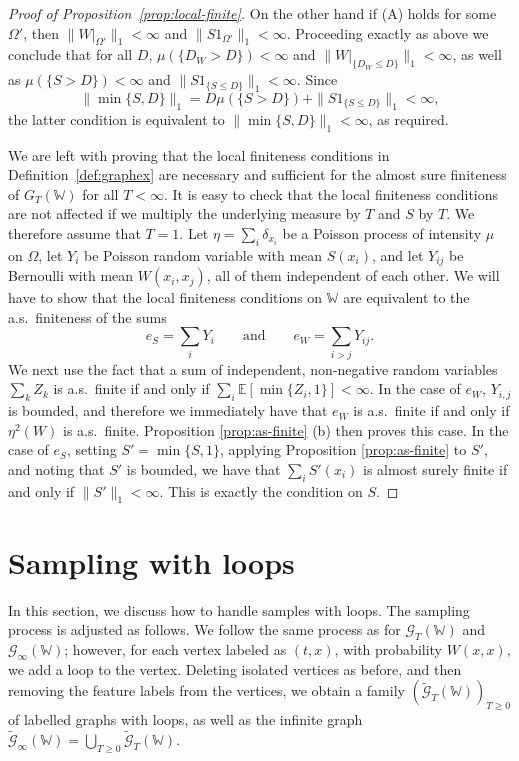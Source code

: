 \documentclass{amsart}
\numberwithin{equation}{section}
\numberwithin{figure}{section}
\theoremstyle{definition}
\theoremstyle{remark}
\newcommand{\EE}{\mathbb{E}}
\newcommand{\cW}{\mathbb{W}}
\newcommand{\cG}{\mathcal{G}}
\begin{document}
\begin{proof}[Proof of Proposition~\ref{prop:local-finite}]
On the other hand if (A) holds for some $\Omega'$, then
$\|W|_{\Omega'}\|_1<\infty$ and $\|S 1_{\Omega'}\|_1<\infty$. Proceeding
exactly as above we conclude that for all $D$, $\mu(\{D_W>D\})<\infty$ and
$\|W|_{\{D_W\leq D\}}\|_1<\infty$, as well as $\mu(\{S>D\})<\infty$ and
$\|S1_{\{S\leq D\}}\|_1<\infty$. Since
\[\|\min\{S,D\}\|_1 = D\mu(\{S>D\}) + \|S1_{\{S\leq D\}}\|_1<\infty
,\] the latter condition is equivalent to $\|\min\{S,D\}\|_1<\infty$, as
required.

We are left with proving that the local finiteness conditions in
Definition~\ref{def:graphex} are necessary and sufficient for the almost sure
finiteness of $G_T(\cW)$ for all $T<\infty$. It is easy to check that the
local finiteness conditions are not affected if we multiply the underlying
measure by $T$ and $S$ by $T$. We therefore assume that $T=1$. Let
$\eta=\sum_{i}\delta_{x_i}$ be a Poisson process of intensity $\mu$ on
$\Omega$, let $Y_i$ be Poisson random variable with mean $S(x_i)$, and let
$Y_{ij}$ be Bernoulli with mean $W(x_i,x_j)$, all of them independent of each
other. We will have to show that the local finiteness conditions on $\cW$ are
equivalent to the a.s.\ finiteness of the sums
\[
e_S=\sum_i Y_i
\qquad\text{and}\qquad
e_W=\sum_{i > j} Y_{ij}.
\]
We next use the fact that a sum of independent, non-negative random variables
$\sum_k Z_k$ is a.s.\ finite if and only if
$\sum_i\EE[\min\{Z_i,1\}]<\infty$. In the case of $e_W$, $Y_{i,j}$ is
bounded, and therefore we immediately have that $e_W$ is a.s.\ finite if and
only if $\eta^2(W)$ is a.s.\ finite. Proposition \ref{prop:as-finite} (b)
then proves this case. In the case of $e_S$, setting $S'=\min\{S,1\}$,
applying Proposition \ref{prop:as-finite} to $S'$, and noting that $S'$ is
bounded, we have that $\sum_i S'(x_i)$ is almost surely finite if and only if
$\|S'\|_1<\infty$. This is exactly the condition on $S$.
\end{proof}

\section{Sampling with loops} \label{sec:samplingwithloops}
In this section, we discuss how to handle samples with loops. The sampling
process is adjusted as follows. We follow the same process as for
$\cG_T(\cW)$ and $\cG_\infty(\cW)$; however, for each vertex labeled as
$(t,x)$, with probability $W(x,x)$, we add a loop to the vertex. Deleting
isolated vertices as before, and then removing the feature labels from the
vertices, we obtain a family $(\widetilde{\cG}_T(\cW))_{T\geq 0}$ of labelled
graphs with loops, as well as the infinite graph
$\widetilde{\cG}_\infty(\cW)=\bigcup_{T\geq 0}\widetilde{\cG}_T(\cW)$.
\end{document}
